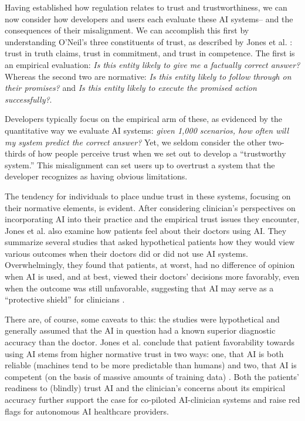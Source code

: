 \documentclass[preprint,12pt]{elsarticle}
\begin{document}
Having established how regulation relates to trust and trustworthiness, we can
now consider how developers and users each evaluate these AI systems-- and the
consequences of their misalignment. We can accomplish this first by
understanding O'Neil's three constituents of trust, as described by Jones et al.
\cite{jonesArtificialIntelligenceClinical2023}: trust in truth claims, trust in
commitment, and trust in competence. The first is an empirical evaluation:
\textit{Is this entity likely to give me a factually correct answer?} Whereas
the second two are normative: \textit{Is this entity likely to follow through on
their promises?} and \textit{Is this entity likely to execute the promised
action successfully?}. 

Developers typically focus on the empirical arm of these, as evidenced by the
quantitative way we evaluate AI systems: \textit{given 1,000 scenarios, how
often will my system predict the correct answer?} Yet, we seldom consider the
other two-thirds of how people perceive trust when we set out to develop a
``trustworthy system.'' This misalignment can set users up to overtrust a system
that the developer recognizes as having obvious limitations. 

The tendency for individuals to place undue trust in these systems, focusing on
their normative elements, is evident. After considering clinician's perspectives
on incorporating AI into their practice and the empirical trust issues they
encounter, Jones et al. \cite{jonesArtificialIntelligenceClinical2023} also
examine how patients feel about their doctors using AI. They summarize several
studies that asked hypothetical patients how they would view various outcomes
when their doctors did or did not use AI systems. Overwhelmingly, they found
that patients, at worst, had no difference of opinion when AI is used, and at
best, viewed their doctors' decisions more favorably, even when the outcome was
still unfavorable, suggesting that AI may serve as a ``protective shield'' for
clinicians \cite{jonesArtificialIntelligenceClinical2023}. 

There are, of course, some caveats to this: the studies were hypothetical and
generally assumed that the AI in question had a known superior diagnostic
accuracy than the doctor. Jones et al. conclude that patient favorability
towards using AI stems from higher normative trust in two ways: one, that AI is
both reliable (machines tend to be more predictable than humans) and two, that
AI is competent (on the basis of massive amounts of training data)
\cite{jonesArtificialIntelligenceClinical2023}. Both the patients' readiness to
(blindly) trust AI and the clinician's concerns about its empirical accuracy
further support the case for co-piloted AI-clinician systems and raise red flags
for autonomous AI healthcare providers. 
\end{document}
